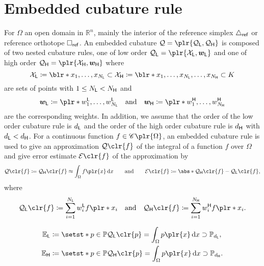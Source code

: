
\section{Embedded cubature rule}

For \( \Omega \) an open domain in \( \mathbb{R}^n \), mainly the interior of the reference simplex \( \triangle_{\mathsf{ref}} \) or reference orthotope \( \square_{\mathsf{ref}} \).
An embedded cubature \( \Quad = \plr{\Quad_\lo, \Quad_\hi} \) is composed of two nested cubature rules, one of low order \( \Quad_\lo = \plr{\calX_\lo, \vec{w}_\lo} \) and one of high order \( \Quad_\hi = \plr{\calX_\hi, \vec{w}_\hi} \) where
\[
    \calX_\lo \coloneqq \blr*{x_1, \ldots, x_{N_\lo}}
    \subset \calX_\hi \coloneqq \blr*{x_1, \ldots, x_{N_\lo}, \ldots, x_{N_\hi}}
    \subset K
\]
are sets of points with \( 1 \leq N_{\mathsf{L}} < N_{\mathsf{H}} \) and
\[
    \vec{w}_\lo \coloneqq \plr*{w_1^\lo, \ldots, w_{N_\lo}^\lo}
    \quad \text{and} \quad
    \vec{w}_\hi \coloneqq \plr*{w_1^\hi, \ldots, w_{N_\hi}^\hi}
\]
are the corresponding weights.
In addition, we assume that the order of the low order cubature rule is \( d_{\mathsf{L}} \) and the order of the high order cubature rule is \( d_{\mathsf{H}} \) with \( d_{\mathsf{L}} < d_{\mathsf{H}} \).
For a continuous function \( f \in \spC\plr{\Omega} \), an embedded cubature rule is used to give an approximation \( \Quad\clr{f} \) of the integral of a function \( f \) over \( \Omega \) and give error estimate \( \Err\clr{f} \) of the approximation by
\[
    \Quad\clr{f} \coloneqq \Quad_\hi\clr{f} \approx \int_\Omega f\plr{x} \di{x}
    \qquad \text{and} \qquad
    \Err\clr{f} \coloneqq \abs*{\Quad_\hi\clr{f} - \Quad_\lo\clr{f}},
\]
where
\[
    \Quad_\lo\clr{f} \coloneqq \sum_{i=1}^{N_\lo} w_i^\lo f\plr*{x_i}
    \quad \text{and} \quad
    \Quad_\hi\clr{f} \coloneqq \sum_{i=1}^{N_\hi} w_i^\hi f\plr*{x_i}.
\]

\begin{align*}
    \mathbb{E}_\lo & \coloneqq \setst*{p \in \spPolyP}{\Quad_\lo\clr{p} = \int_\Omega p\plr{x} \di{x}} \supset \spPolyP[d_\lo],
    \\
    \mathbb{E}_\hi & \coloneqq \setst*{p \in \spPolyP}{\Quad_\hi\clr{p} = \int_\Omega p\plr{x} \di{x}} \supset \spPolyP[d_\hi].
\end{align*}
